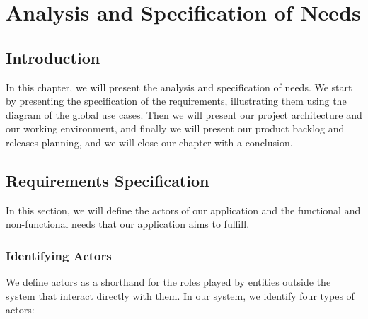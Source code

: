 \chapter{Analysis and Specification of Needs}

\section{Introduction}

In this chapter, we will present the analysis and specification of needs. We start by presenting the specification of the requirements, illustrating them using the diagram of the global use cases. Then we will present our project architecture and our working environment, and finally we will present our product backlog and releases planning, and we will close our chapter with a conclusion.

\section{Requirements Specification}

In this section, we will define the actors of our application and the functional and non-functional needs that our application aims to fulfill.

\subsection{Identifying Actors}

We define actors as a shorthand for the roles played by entities outside the system that interact directly with them. In our system, we identify four types of actors:

